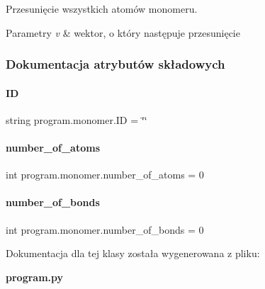 Przesunięcie wszystkich atomów monomeru. 


\begin{DoxyParams}{Parametry}
{\em v} & wektor, o który następuje przesunięcie \\
\hline
\end{DoxyParams}


\subsubsection{Dokumentacja atrybutów składowych}
\mbox{\label{classprogram_1_1monomer_aab4fa0ddb4cf930fee5881428b1b43df}} 
\paragraph{ID}
{\footnotesize\ttfamily string program.\+monomer.\+ID = \char`\"{}\char`\"{}\hspace{0.3cm}{\ttfamily [static]}}

\mbox{\label{classprogram_1_1monomer_ac4dfc73496f61b095c307d79c15dd844}} 
\paragraph{number\+\_\+of\+\_\+atoms}
{\footnotesize\ttfamily int program.\+monomer.\+number\+\_\+of\+\_\+atoms = 0\hspace{0.3cm}{\ttfamily [static]}}

\mbox{\label{classprogram_1_1monomer_a03c5add1ad992fcd0f53c9c9540b343b}} 
\paragraph{number\+\_\+of\+\_\+bonds}
{\footnotesize\ttfamily int program.\+monomer.\+number\+\_\+of\+\_\+bonds = 0\hspace{0.3cm}{\ttfamily [static]}}



Dokumentacja dla tej klasy została wygenerowana z pliku\+:\begin{DoxyCompactItemize}
\item 
\textbf{ program.\+py}\end{DoxyCompactItemize}
